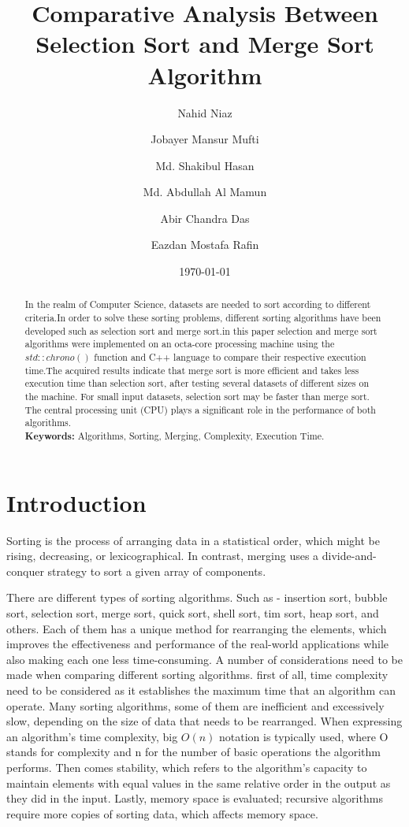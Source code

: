 \documentclass[twocolumn]{article}
\title{Comparative Analysis Between Selection Sort and Merge Sort Algorithm}
\author{Nahid Niaz}
\author{Jobayer Mansur Mufti}
\author{Md. Shakibul Hasan}
\author{Md. Abdullah Al Mamun}
\author{Abir Chandra Das}
\author{Eazdan Mostafa Rafin}
\affil{Department of Computer Science and Engineering, Rajshahi University of Engineering and Technology}
\date{\today}
\begin{document}
\maketitle

\begin{abstract}
    In the realm of Computer Science, datasets are needed to sort according to different criteria.In order to solve these sorting problems, different sorting algorithms have been developed such as selection sort and merge sort.in this paper selection and merge sort algorithms were implemented on an octa-core processing machine using the $std::chrono()$ function and C++ language to compare their  respective execution time.The acquired results indicate that merge sort is more efficient and takes less execution time than selection sort, after testing several datasets of different sizes on the machine. For small input datasets, selection sort may be faster than merge sort. The central processing unit (CPU) plays a significant role in the performance of both algorithms.
    \\
    \textbf{Keywords:} Algorithms, Sorting, Merging, Complexity, Execution Time.

\end{abstract}


\section*{Introduction}
Sorting is the process of arranging data in a statistical order, which might be rising, decreasing, or lexicographical. In contrast, merging uses a divide-and-conquer strategy to sort a given array of components.

There are different types of sorting algorithms. Such as - insertion sort, bubble sort, selection sort, merge sort, quick sort, shell sort, tim sort, heap sort, and others. Each of them has a unique method for rearranging the elements, which improves the effectiveness and performance of the real-world applications while also making each one less time-consuming. A number of considerations need to be made when comparing different sorting algorithms. first of all, time complexity need to be considered as it establishes the maximum time that an algorithm can operate\cite{goodrich2010datap}. Many sorting algorithms, some of them are inefficient and excessively slow, depending on the size of data that needs to be rearranged. When expressing an algorithm's time complexity, big $O(n)$ notation is typically used, where O stands for complexity and n for the number of basic operations the algorithm performs\cite{jadoon2011design}. Then comes stability, which refers to the algorithm's capacity to maintain elements with equal values in the same relative order in the output as they did in the input\cite{ahmed2019stable}. Lastly, memory space is evaluated; recursive algorithms require more copies of sorting data, which affects memory space\cite{goodrich2010data}.
\end{document}
